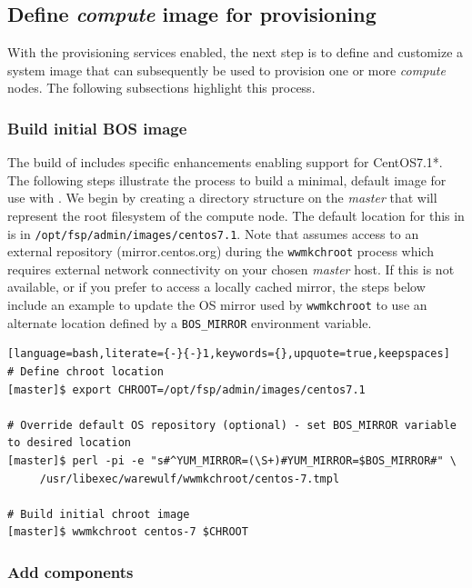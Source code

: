\documentclass[letterpaper]{article}
\newcommand{\baseOS}{CentOS7.1*}
\begin{document}
\subsection{Define {\em compute} image for provisioning}

With the provisioning services enabled, the next step is to define and
customize a system image that can subsequently be used to provision one or more
{\em compute} nodes. The following subsections highlight this process.

\subsubsection{Build initial BOS image}

The \FSP{} build of \Warewulf{} includes specific enhancements enabling support for
\baseOS{}. The following steps illustrate the process to build a minimal, default
image for use with \Warewulf{}.  We begin by creating a directory structure on the 
{\em master} that will represent the root filesystem of the compute node. The 
default location for this in \FSP{} is in
\texttt{/opt/fsp/admin/images/centos7.1}. Note that \Warewulf{} assumes access to
an external repository (mirror.centos.org) during the \texttt{wwmkchroot}
process which requires external network connectivity on your chosen {\em
  master} host. If this is not available, or if you prefer to access a locally cached
mirror, the steps below include an example to update the OS mirror used by
\texttt{wwmkchroot} to use an alternate location defined by a
\texttt{BOS\_MIRROR} environment variable.

\begin{lstlisting}[language=bash,literate={-}{-}1,keywords={},upquote=true,keepspaces]
# Define chroot location 
[master]$ export CHROOT=/opt/fsp/admin/images/centos7.1

# Override default OS repository (optional) - set BOS_MIRROR variable to desired location
[master]$ perl -pi -e "s#^YUM_MIRROR=(\S+)#YUM_MIRROR=$BOS_MIRROR#" \
     /usr/libexec/warewulf/wwmkchroot/centos-7.tmpl

# Build initial chroot image
[master]$ wwmkchroot centos-7 $CHROOT
\end{lstlisting}

\subsubsection{Add \FSP{} components}
\end{document}
